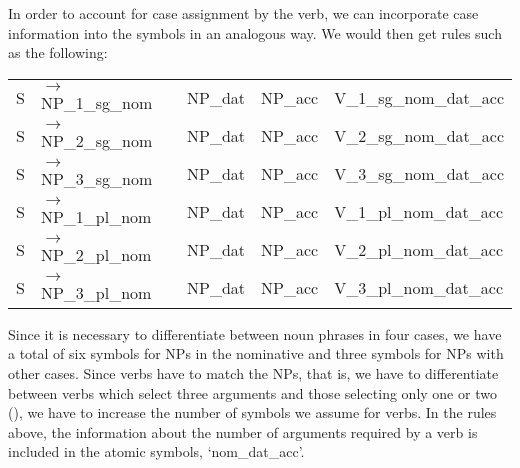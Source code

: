 In order to account for case assignment by the verb, we can incorporate case information into the symbols in an analogous way. We would then
get rules such as the following:
\ea
\label{ditrans-ps-regeln}
\begin{tabular}[t]{@{}l@{ }l@{~~}l@{~~}l@{~~}l}
S  & $\to$ NP\_1\_sg\_nom & NP\_dat & NP\_acc & V\_1\_sg\_nom\_dat\_acc\\
S  & $\to$ NP\_2\_sg\_nom & NP\_dat & NP\_acc & V\_2\_sg\_nom\_dat\_acc\\
S  & $\to$ NP\_3\_sg\_nom & NP\_dat & NP\_acc & V\_3\_sg\_nom\_dat\_acc\\
S  & $\to$ NP\_1\_pl\_nom & NP\_dat & NP\_acc & V\_1\_pl\_nom\_dat\_acc\\
S  & $\to$ NP\_2\_pl\_nom & NP\_dat & NP\_acc & V\_2\_pl\_nom\_dat\_acc\\
S  & $\to$ NP\_3\_pl\_nom & NP\_dat & NP\_acc & V\_3\_pl\_nom\_dat\_acc\\
\end{tabular}
\z
Since it is necessary to differentiate between noun phrases in four cases, we have a total of six symbols for NPs in the nominative and three symbols for NPs with
other cases. Since verbs have to match the NPs, that is, we have to differentiate between verbs which select three arguments and those selecting only one or two (),
we have to increase the number of symbols we assume for verbs.
\eal
{}
\zl
In the rules above, the information about the number of arguments required by a verb is included in
the atomic symbols, \eg `nom\_dat\_acc'.

